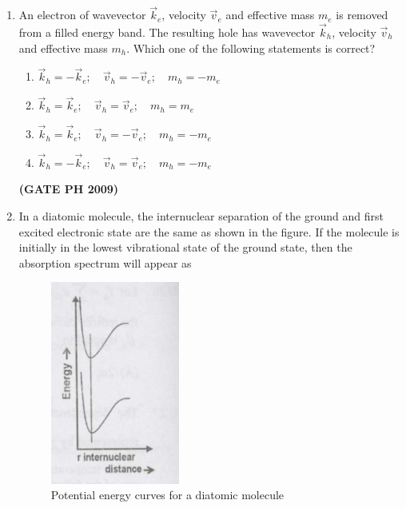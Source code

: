 \documentclass[14pt, a4paper]{extarticle}
\begin{document}
\begin{enumerate}[label=\textbf{Q. \arabic*}, start=21]
\item An electron of wavevector $\vec{k}_e$, velocity $\vec{v}_e$ and effective mass $m_e$ is removed from a filled energy band. The resulting hole has wavevector $\vec{k}_h$, velocity $\vec{v}_h$ and effective mass $m_h$. Which one of the following statements is correct?
\begin{enumerate}
\item $\vec{k}_h = -\vec{k}_e; \quad \vec{v}_h = -\vec{v}_e; \quad m_h = -m_e$
\item $\vec{k}_h = \vec{k}_e; \quad \vec{v}_h = \vec{v}_e; \quad m_h = m_e$
\item $\vec{k}_h = \vec{k}_e; \quad \vec{v}_h = -\vec{v}_e; \quad m_h = -m_e$
\item $\vec{k}_h = -\vec{k}_e; \quad \vec{v}_h = \vec{v}_e; \quad m_h = -m_e$
\end{enumerate}
\hfill \textbf{(GATE PH 2009)}

\vspace{24em}

\item In a diatomic molecule, the internuclear separation of the ground and first excited electronic state are the same as shown in the figure.
If the molecule is initially in the lowest vibrational state of the ground state, then the absorption spectrum will appear as
\begin{figure}[H]
\centering
\includegraphics[width=0.4\textwidth]{figs/Q30fig1.png}
\caption{Potential energy curves for a diatomic molecule}
\label{fig:q30_main}
\end{figure}
\begin{enumerate}
\end{enumerate}
\end{enumerate}
\end{document}
